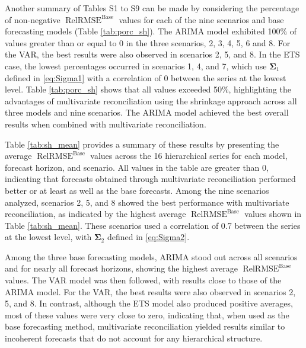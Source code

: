 \documentclass[a4paper,preprint,11pt,authoryear]{elsarticle}
\DeclareMathOperator{\RelRMSE}{RelRMSE}
\DeclareMathOperator{\Base}{Base}
\begin{document}
Another summary of Tables S1 to S9 can be made by considering the percentage of non-negative $\RelRMSE^{\Base}$ values for each of the nine scenarios and base forecasting models (Table \ref{tab:porc_sh}). The ARIMA model exhibited 100\% of values greater than or equal to 0 in the three scenarios, 2, 3, 4, 5, 6 and 8. For the VAR, the best results were also observed in scenarios 2, 5, and 8. In the ETS case, the lowest percentages occurred in scenarios 1, 4, and 7, which use $\bm{\Sigma}_1$ defined in \eqref{eq:Sigma1} with a correlation of 0 between the series at the lowest level. Table \ref{tab:porc_sh} shows that all values exceeded 50\%, highlighting the advantages of multivariate reconciliation using the shrinkage approach across all three models and nine scenarios. The ARIMA model achieved the best overall results when combined with multivariate reconciliation.


Table \ref{tab:sh_mean} provides a summary of these results by presenting the average $\RelRMSE^{\Base}$ values across the 16 hierarchical series for each model, forecast horizon, and scenario. All values in the table are greater than 0, indicating that forecasts obtained through multivariate reconciliation performed better or at least as well as the base forecasts. Among the nine scenarios analyzed, scenarios 2, 5, and 8 showed the best performance with multivariate reconciliation, as indicated by the highest average $\RelRMSE^{\Base}$ values shown in Table \ref{tab:sh_mean}. These scenarios used a correlation of 0.7 between the series at the lowest level, with $\bm{\Sigma}_2$ defined in \eqref{eq:Sigma2}.

Among the three base forecasting models, ARIMA stood out across all scenarios and for nearly all forecast horizons, showing the highest average $\RelRMSE^{\Base}$ values. The VAR model was then followed, with results close to those of the ARIMA model. For the VAR, the best results were also observed in scenarios 2, 5, and 8. In contrast, although the ETS model also produced positive averages, most of these values were very close to zero, indicating that, when used as the base forecasting method, multivariate reconciliation yielded results similar to incoherent forecasts that do not account for any hierarchical structure.
\end{document}
